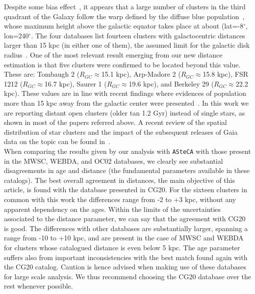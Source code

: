 \documentclass[draft]{aa}
\begin{document}
  Despite some bias effect~\citep[e.g. lower dust absorption, particularly
  along the Fitzgerald window][]{Fitzgerald_1968}, it appears that a large
  number of clusters in the third quadrant of the Galaxy follow the warp defined
  by the diffuse blue population~\citep{Carraro_2005_detection,Moitinho_2006},
  whose maximum height above the galactic equator takes place at about
  (lat=-8$^{\circ}$, lon=240$^{\circ}$.
  The four databases list fourteen clusters with galactocentric distances larger
  than 15 kpc (in either one of them), the assumed limit for the galactic disk
  radius~\citep[see][and references therein]{Carraro_2010}.
  One of the most relevant result emerging from our new distance estimation is
  that five clusters were confirmed to be located beyond this value.
  These are: Tombaugh 2 ($R_{GC}\approx$15.1 kpc), Arp-Madore 2
  ($R_{GC}\approx$15.8 kpc), FSR 1212 ($R_{GC}\approx$16.7 kpc), Saurer 1
  ($R_{GC}\approx$19.6 kpc), and Berkeley 29 ($R_{GC}\approx$22.2 kpc). These
  values are in line with recent findings where evidences of population more than
  15 kpc away from the galactic center were presented~\citep[][and references
  therein]{Liu_2017,Lopez_2018}.
  In this work we are reporting distant open clusters (older tan 1.2 Gyr)
  instead of single stars, as shown in most of the papers referred above.
  A recent review of the spatial distribution of star clusters and
  the impact of the subsequent releases of Gaia data on the topic can be found
  in~\cite{Cantat-Gaudin_2022}.\\

  When comparing the results given by our analysis with \texttt{ASteCA} with
  those present in the MWSC, WEBDA, and OC02 databases, we clearly
  see substantial disagreements in age and distance (the fundamental
  parameters available in these catalogs).
  The best overall agreement in distances, the main objective of this article,
  is found with the database presented in CG20. For the sixteen clusters in
  common with this work the differences range from -2 to +3 kpc, without any
  apparent dependency on the ages. Within the limits of the uncertainties
  associated to the distance parameter, we can say that the agreement with
  CG20 is good.
  The differences with other databases are substantially larger, spanning a
  range from -10 to +10 kpc, and are present in the case of MWSC and WEBDA for
  clusters whose catalogued distance is even below 5 kpc.
  The age parameter suffers also from important inconsistencies with
  the best match found again with the CG20 catalog.
  Caution is hence advised when making use of these databases for large scale
  analysis. We thus recommend choosing the CG20 database over the rest whenever
  possible.
\end{document}
